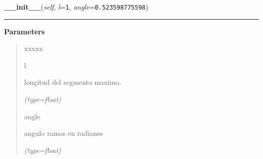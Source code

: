     \vspace{0.5ex}

\hspace{.8\funcindent}\begin{boxedminipage}{\funcwidth}

    \raggedright \textbf{\_\_init\_\_}(\textit{self}, \textit{l}={\tt 1}, \textit{angle}={\tt 0.523598775598})

    \vspace{-1.5ex}

    \rule{\textwidth}{0.5\fboxrule}
\setlength{\parskip}{2ex}
\setlength{\parskip}{1ex}
      \textbf{Parameters}
      \vspace{-1ex}

      \begin{quote}
        \begin{Ventry}{xxxxx}

          \item[l]

          longitud del segmento maximo.

            {\it (type=float)}

          \item[angle]

          angulo ramas en radianes

            {\it (type=float)}

        \end{Ventry}

      \end{quote}

    \end{boxedminipage}

    \label{FractalZE:arbol:Arbol:segmentLength}

    \vspace{0.5ex}

